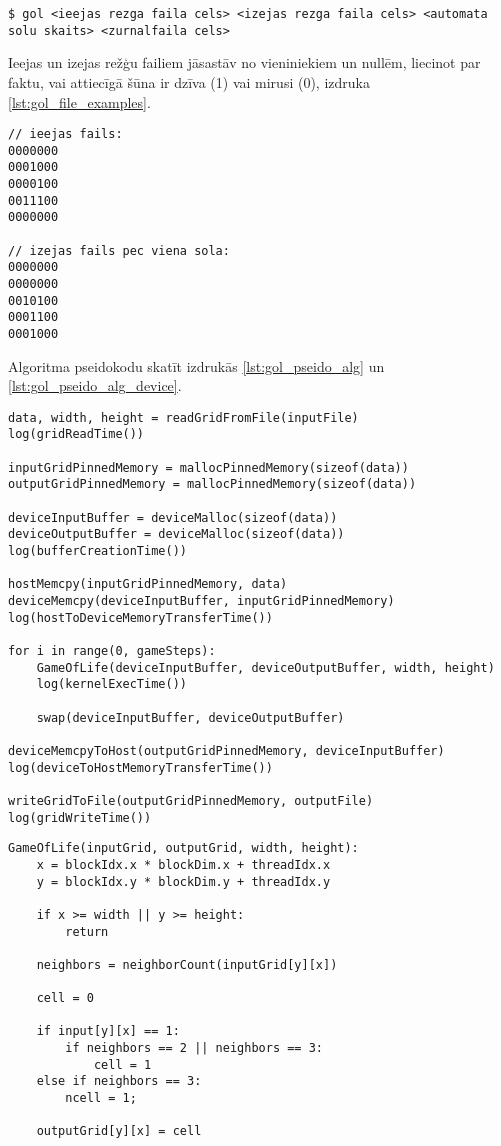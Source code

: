 \begin{lstlisting}[caption={Programmas galvenā izpilde},
    captionpos=b,
    label=lst:gol_mains]
$ gol <ieejas rezga faila cels> <izejas rezga faila cels> <automata solu skaits> <zurnalfaila cels> 
\end{lstlisting}

Ieejas un izejas režģu failiem jāsastāv no vieniniekiem un nullēm, liecinot par
faktu, vai attiecīgā šūna ir dzīva (1) vai mirusi (0), izdruka
\ref{lst:gol_file_examples}.

\begin{lstlisting}[caption={Ieejas, izejas faila piemērs (ar tā saukto planiera rakstu)},
    captionpos=b,
    label=lst:gol_file_examples]
// ieejas fails:
0000000
0001000
0000100
0011100
0000000

// izejas fails pec viena sola:
0000000
0000000
0010100
0001100
0001000
\end{lstlisting}

Algoritma pseidokodu skatīt izdrukās \ref{lst:gol_pseido_alg} un  \ref{lst:gol_pseido_alg_device}.
\begin{lstlisting}[caption={"Dzīves spēles" šūnu automāta CPU puses pseidokods},
    captionpos=b,
    label=lst:gol_pseido_alg]
data, width, height = readGridFromFile(inputFile)
log(gridReadTime())

inputGridPinnedMemory = mallocPinnedMemory(sizeof(data))
outputGridPinnedMemory = mallocPinnedMemory(sizeof(data))

deviceInputBuffer = deviceMalloc(sizeof(data))
deviceOutputBuffer = deviceMalloc(sizeof(data))
log(bufferCreationTime())

hostMemcpy(inputGridPinnedMemory, data)
deviceMemcpy(deviceInputBuffer, inputGridPinnedMemory)
log(hostToDeviceMemoryTransferTime())

for i in range(0, gameSteps):
    GameOfLife(deviceInputBuffer, deviceOutputBuffer, width, height)
    log(kernelExecTime())

    swap(deviceInputBuffer, deviceOutputBuffer)

deviceMemcpyToHost(outputGridPinnedMemory, deviceInputBuffer)
log(deviceToHostMemoryTransferTime())

writeGridToFile(outputGridPinnedMemory, outputFile)
log(gridWriteTime())
\end{lstlisting}

\begin{lstlisting}[caption={"Dzīves spēles" šūnu automāta GPGPU kodola pseidokods},
    captionpos=b,
    label=lst:gol_pseido_alg_device]
GameOfLife(inputGrid, outputGrid, width, height):
    x = blockIdx.x * blockDim.x + threadIdx.x
    y = blockIdx.y * blockDim.y + threadIdx.y

    if x >= width || y >= height:
        return

    neighbors = neighborCount(inputGrid[y][x])
    
    cell = 0

    if input[y][x] == 1:
		if neighbors == 2 || neighbors == 3:
		    cell = 1
	else if neighbors == 3:
        ncell = 1;

    outputGrid[y][x] = cell
\end{lstlisting}


